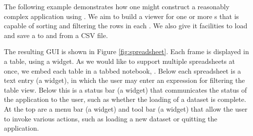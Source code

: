 \documentclass[article,shortnames]{jss}
\begin{document}
The following example demonstrates how one might construct a
reasonably complex
application using . We aim to build a viewer for one or
more  s that is capable of sorting and
filtering the
rows in each . We also give it facilities to load and
save a  to and from a CSV file. 

The resulting GUI is shown in Figure \ref{fig:spreadsheet}. Each
 frame is displayed in a table, using a
 widget. As we would like to support multiple
spreadsheets at once, we embed each table in a tabbed notebook,
. Below each spreadsheet is a text entry (a
 widget), in which the user may enter an expression for
filtering the table view. Below this is a status bar (a
 widget) that communicates the status
of the application to the user, such as whether the loading of a
dataset is complete. At the top are a menu bar (a 
widget) and tool bar (a  widget) that allow the user
to invoke various actions, such as loading a new dataset or quitting
the application.



%



\end{document}
